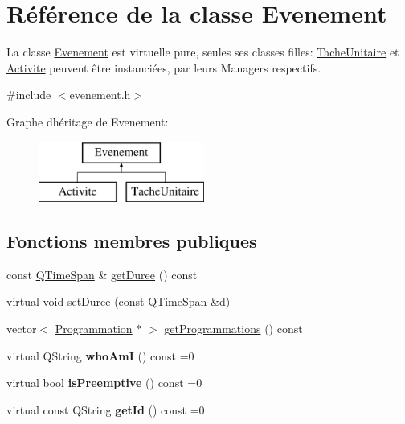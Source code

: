 \hypertarget{class_evenement}{}\section{Référence de la classe Evenement}
\label{class_evenement}


La classe \hyperlink{class_evenement}{Evenement} est virtuelle pure, seules ses classes filles\+: \hyperlink{class_tache_unitaire}{Tache\+Unitaire} et \hyperlink{class_activite}{Activite} peuvent être instanciées, par leurs Managers respectifs.  




{\ttfamily \#include $<$evenement.\+h$>$}

Graphe d\textquotesingle{}héritage de Evenement\+:\begin{figure}[H]
\begin{center}
\leavevmode
\includegraphics[height=2.000000cm]{class_evenement}
\end{center}
\end{figure}
\subsection*{Fonctions membres publiques}
\begin{DoxyCompactItemize}
\item 
const \hyperlink{class_q_time_span}{Q\+Time\+Span} \& \hyperlink{class_evenement_aec0228042f3cfe8ec970ddcbbaa57dd8}{get\+Duree} () const 
\item 
virtual void \hyperlink{class_evenement_a8e7e4eb2ec7352a1bf5a63df42c193c6}{set\+Duree} (const \hyperlink{class_q_time_span}{Q\+Time\+Span} \&d)
\item 
vector$<$ \hyperlink{class_programmation}{Programmation} $\ast$ $>$ \hyperlink{class_evenement_a5f451f67822905b35adf6c089b1f8aef}{get\+Programmations} () const 
\item 
\hypertarget{class_evenement_ace9b05926d5866254293a8a295f98e0d}{}virtual Q\+String {\bfseries who\+Am\+I} () const =0\label{class_evenement_ace9b05926d5866254293a8a295f98e0d}

\item 
\hypertarget{class_evenement_a941fd5fed58174df6cc2675306c80db7}{}virtual bool {\bfseries is\+Preemptive} () const =0\label{class_evenement_a941fd5fed58174df6cc2675306c80db7}

\item 
\hypertarget{class_evenement_a8230234b16a5056d7ec222ae79869770}{}virtual const Q\+String {\bfseries get\+Id} () const =0\label{class_evenement_a8230234b16a5056d7ec222ae79869770}

\end{DoxyCompactItemize}

